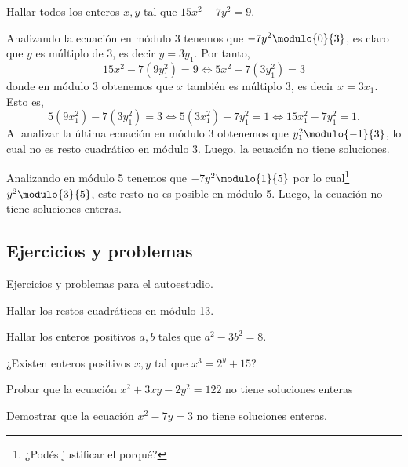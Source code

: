 \begin{example}
    Hallar todos los enteros $x,y$ tal que $15x^2 - 7y^2 = 9$.
\end{example}
\begin{solution}[1]
    Analizando la ecuación en módulo 3 tenemos que $-7y^2 \modulo{0}{3}$, es claro que $y$ es múltiplo de 3, es decir $y = 3y_1$.
    Por tanto,
    \[
        15x^2 - 7(9y_1^2) = 9 \iff 5x^2 - 7(3y_1^2) = 3
    \]
    donde en módulo 3 obtenemos que $x$ también es múltiplo 3, es decir $x = 3x_1$.
    Esto es,
    \[
        5(9x_1^2) - 7(3y_1^2) = 3 \iff 5(3x_1^2) - 7y_1^2 = 1 \iff 15x_1^2 - 7y_1^2 = 1.
    \]
    Al analizar la última ecuación en módulo 3 obtenemos que $y_1^2 \modulo{-1}{3}$, lo cual no es resto cuadrático en módulo 3.
    Luego, la ecuación no tiene soluciones.
\end{solution}

\begin{solution}[2]
    Analizando en módulo 5 tenemos que $-7y^2 \modulo{1}{5}$ por lo cual\footnote{¿Podés justificar el porqué?} $y^2 \modulo{3}{5}$,
    este resto no es posible en módulo 5.
    Luego, la ecuación no tiene soluciones enteras.
\end{solution}


\subsection{Ejercicios y problemas}

Ejercicios y problemas para el autoestudio.

\begin{exercise}
    Hallar los restos cuadráticos en módulo 13.
\end{exercise}

\begin{exercise}
    Hallar los enteros positivos $a,b$ tales que $a^2 - 3b^2 = 8$.
\end{exercise}

\begin{exercise}
    ¿Existen enteros positivos $x,y$ tal que $x^3 = 2^y + 15$?
\end{exercise}

\begin{exercise}
    Probar que la ecuación $x^2 + 3xy - 2y^2 = 122$ no tiene soluciones enteras
\end{exercise}

\begin{exercise}
    Demostrar que la ecuación $x^2 - 7y = 3$ no tiene soluciones enteras.
\end{exercise}

